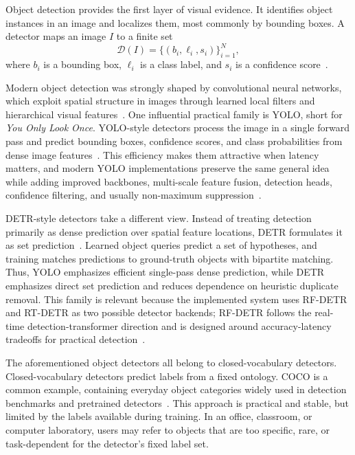 Object detection provides the first layer of visual evidence. It identifies object instances in an image and localizes them, most commonly by bounding boxes. A detector maps an image \(I\) to a finite set
\[
\mathcal{D}(I)=\{(b_i,\ell_i,s_i)\}_{i=1}^{N},
\]
where \(b_i\) is a bounding box, \(\ell_i\) is a class label, and \(s_i\) is a confidence score~\cite[Section 50.4.1]{foundationsCVbook}.

Modern object detection was strongly shaped by convolutional neural networks, which exploit spatial structure in images through learned local filters and hierarchical visual features~\cite[439]{lecun_deep_2015}. One influential practical family is YOLO, short for \emph{You Only Look Once}. YOLO-style detectors process the image in a single forward pass and predict bounding boxes, confidence scores, and class probabilities from dense image features~\cite{redmon_you_2016}. This efficiency makes them attractive when latency matters, and modern YOLO implementations preserve the same general idea while adding improved backbones, multi-scale feature fusion, detection heads, confidence filtering, and usually non-maximum suppression~\cite{sapkota_ultralytics_2026}.

DETR-style detectors take a different view. Instead of treating detection primarily as dense prediction over spatial feature locations, DETR formulates it as set prediction~\cite{carion_end--end_2020}. Learned object queries predict a set of hypotheses, and training matches predictions to ground-truth objects with bipartite matching. Thus, YOLO emphasizes efficient single-pass dense prediction, while DETR emphasizes direct set prediction and reduces dependence on heuristic duplicate removal. This family is relevant because the implemented system uses RF-DETR and RT-DETR as two possible detector backends; RF-DETR follows the real-time detection-transformer direction and is designed around accuracy-latency tradeoffs for practical detection~\cite{robinson_rf-detr_2026}.

The afore\-mention\-ed object detectors all belong to closed-vocabulary detectors. Closed-vo\-ca\-bul\-ary detectors predict labels from a fixed ontology. COCO is a common example, containing everyday object categories widely used in detection benchmarks and pretrained detectors~\cite{lin2015microsoftcococommonobjects}. This approach is practical and stable, but limited by the labels available during training. In an office, classroom, or computer laboratory, users may refer to objects that are too specific, rare, or task-dependent for the detector's fixed label set.

